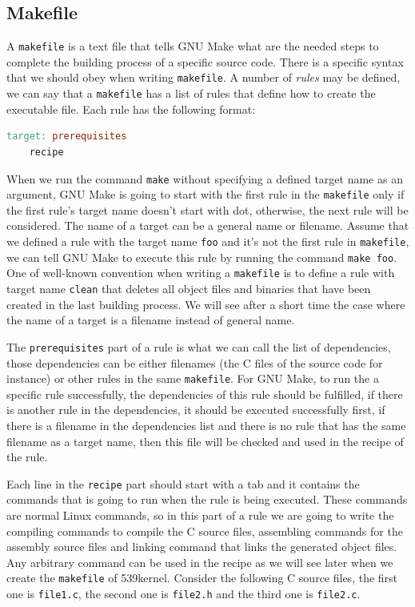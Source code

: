 \subsection{Makefile}\label{makefile}

A \lstinline!makefile! is a text file that tells GNU Make what are the
needed steps to complete the building process of a specific source code.
There is a specific syntax that we should obey when writing
\lstinline!makefile!. A number of \emph{rules} may be defined, we can
say that a \lstinline!makefile! has a list of rules that define how to
create the executable file. Each rule has the following format:

\begin{lstlisting}[language=make]
target: prerequisites
    recipe
\end{lstlisting}

When we run the command \lstinline!make! without specifying a defined
target name as an argument, GNU Make is going to start with the first
rule in the \lstinline!makefile! only if the first rule's target name
doesn't start with dot, otherwise, the next rule will be considered. The
name of a target can be a general name or filename. Assume that we
defined a rule with the target name \lstinline!foo! and it's not the
first rule in \lstinline!makefile!, we can tell GNU Make to execute this
rule by running the command \lstinline!make foo!. One of well-known
convention when writing a \lstinline!makefile! is to define a rule with
target name \lstinline!clean! that deletes all object files and binaries
that have been created in the last building process. We will see after a
short time the case where the name of a target is a filename instead of
general name.

The \lstinline!prerequisites! part of a rule is what we can call the
list of dependencies, those dependencies can be either filenames (the C
files of the source code for instance) or other rules in the same
\lstinline!makefile!. For GNU Make, to run the a specific rule
successfully, the dependencies of this rule should be fulfilled, if
there is another rule in the dependencies, it should be executed
successfully first, if there is a filename in the dependencies list and
there is no rule that has the same filename as a target name, then this
file will be checked and used in the recipe of the rule.

Each line in the \lstinline!recipe! part should start with a tab and it
contains the commands that is going to run when the rule is being
executed. These commands are normal Linux commands, so in this part of a
rule we are going to write the compiling commands to compile the C
source files, assembling commands for the assembly source files and
linking command that links the generated object files. Any arbitrary
command can be used in the recipe as we will see later when we create
the \lstinline!makefile! of 539kernel. Consider the following C source
files, the first one is \lstinline!file1.c!, the second one is
\lstinline!file2.h! and the third one is \lstinline!file2.c!.

